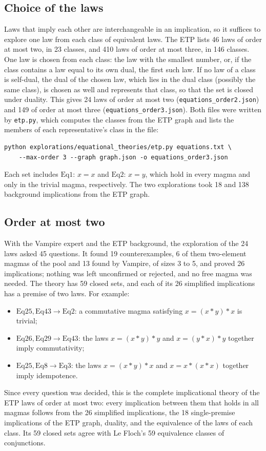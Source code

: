 \documentclass[11pt,a4paper]{article}
\theoremstyle{definition}
\theoremstyle{remark}
\newcommand{\code}[1]{\texttt{#1}}
\newcommand{\Eq}[1]{\mathrm{Eq}#1}
\begin{document}
\subsection{Choice of the laws}

Laws that imply each other are interchangeable in an implication, so it suffices to explore one law from each class of equivalent laws. The ETP lists 46 laws of order at most two, in 23 classes, and 410 laws of order at most three, in 146 classes. One law is chosen from each class: the law with the smallest number, or, if the class contains a law equal to its own dual, the first such law. If no law of a class is self-dual, the dual of the chosen law, which lies in the dual class (possibly the same class), is chosen as well and represents that class, so that the set is closed under duality. This gives 24 laws of order at most two (\code{equations\_order2.json}) and 149 of order at most three (\code{equations\_order3.json}). Both files were written by \code{etp.py}, which computes the classes from the ETP graph and lists the members of each representative's class in the file:
\begin{Verbatim}
python explorations/equational_theories/etp.py equations.txt \
    --max-order 3 --graph graph.json -o equations_order3.json
\end{Verbatim}
Each set includes $\Eq{1}$: $x = x$ and $\Eq{2}$: $x = y$, which hold in every magma and only in the trivial magma, respectively. The two explorations took 18 and 138 background implications from the ETP graph.

\subsection{Order at most two}

With the Vampire expert and the ETP background, the exploration of the 24 laws asked 45 questions. It found 19 counterexamples, 6 of them two-element magmas of the pool and 13 found by Vampire, of sizes 3 to 5, and proved 26 implications; nothing was left unconfirmed or rejected, and no free magma was needed. The theory has 59 closed sets, and each of its 26 simplified implications has a premise of two laws. For example:
\begin{itemize}
  \item $\Eq{25}, \Eq{43} \to \Eq{2}$: a commutative magma satisfying $x = (x * y) * x$ is trivial;
  \item $\Eq{26}, \Eq{29} \to \Eq{43}$: the laws $x = (x * y) * y$ and $x = (y * x) * y$ together imply commutativity;
  \item $\Eq{25}, \Eq{8} \to \Eq{3}$: the laws $x = (x * y) * x$ and $x = x * (x * x)$ together imply idempotence.
\end{itemize}
Since every question was decided, this is the complete implicational theory of the ETP laws of order at most two: every implication between them that holds in all magmas follows from the 26 simplified implications, the 18 single-premise implications of the ETP graph, duality, and the equivalence of the laws of each class. Its 59 closed sets agree with Le Floch's 59 equivalence classes of conjunctions.
\end{document}

